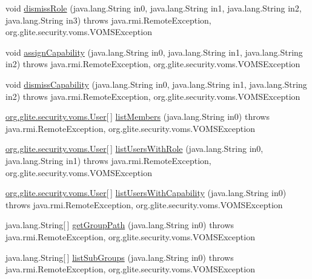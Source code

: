 \begin{DoxyCompactItemize}
\item 
void \hyperlink{interfaceorg_1_1glite_1_1security_1_1voms_1_1service_1_1admin_1_1VOMSAdmin_a886f9fccf6a7df9c6b91ed59d79f9982}{dismissRole} (java.lang.String in0, java.lang.String in1, java.lang.String in2, java.lang.String in3)  throws java.rmi.RemoteException, org.glite.security.voms.VOMSException
\item 
void \hyperlink{interfaceorg_1_1glite_1_1security_1_1voms_1_1service_1_1admin_1_1VOMSAdmin_a7970b0f5dfbdf135bedd413305b33514}{assignCapability} (java.lang.String in0, java.lang.String in1, java.lang.String in2)  throws java.rmi.RemoteException, org.glite.security.voms.VOMSException
\item 
void \hyperlink{interfaceorg_1_1glite_1_1security_1_1voms_1_1service_1_1admin_1_1VOMSAdmin_aa90fd4a29ffb1daae1cbc73d2eced653}{dismissCapability} (java.lang.String in0, java.lang.String in1, java.lang.String in2)  throws java.rmi.RemoteException, org.glite.security.voms.VOMSException
\item 
\hyperlink{classorg_1_1glite_1_1security_1_1voms_1_1User}{org.glite.security.voms.User}\mbox{[}$\,$\mbox{]} \hyperlink{interfaceorg_1_1glite_1_1security_1_1voms_1_1service_1_1admin_1_1VOMSAdmin_a338612f5e41990ac9ef0b070b09ffeeb}{listMembers} (java.lang.String in0)  throws java.rmi.RemoteException, org.glite.security.voms.VOMSException
\item 
\hyperlink{classorg_1_1glite_1_1security_1_1voms_1_1User}{org.glite.security.voms.User}\mbox{[}$\,$\mbox{]} \hyperlink{interfaceorg_1_1glite_1_1security_1_1voms_1_1service_1_1admin_1_1VOMSAdmin_a1d333d0a1c328145f626f47313324643}{listUsersWithRole} (java.lang.String in0, java.lang.String in1)  throws java.rmi.RemoteException, org.glite.security.voms.VOMSException
\item 
\hyperlink{classorg_1_1glite_1_1security_1_1voms_1_1User}{org.glite.security.voms.User}\mbox{[}$\,$\mbox{]} \hyperlink{interfaceorg_1_1glite_1_1security_1_1voms_1_1service_1_1admin_1_1VOMSAdmin_a2c0f19e37d956785695fded8196b3571}{listUsersWithCapability} (java.lang.String in0)  throws java.rmi.RemoteException, org.glite.security.voms.VOMSException
\item 
java.lang.String\mbox{[}$\,$\mbox{]} \hyperlink{interfaceorg_1_1glite_1_1security_1_1voms_1_1service_1_1admin_1_1VOMSAdmin_aa05d3561e3a55b86c8f623c476f58bab}{getGroupPath} (java.lang.String in0)  throws java.rmi.RemoteException, org.glite.security.voms.VOMSException
\item 
java.lang.String\mbox{[}$\,$\mbox{]} \hyperlink{interfaceorg_1_1glite_1_1security_1_1voms_1_1service_1_1admin_1_1VOMSAdmin_aa1e810a4f059f8fa7d2e11084808bacc}{listSubGroups} (java.lang.String in0)  throws java.rmi.RemoteException, org.glite.security.voms.VOMSException

\end{DoxyCompactItemize}
